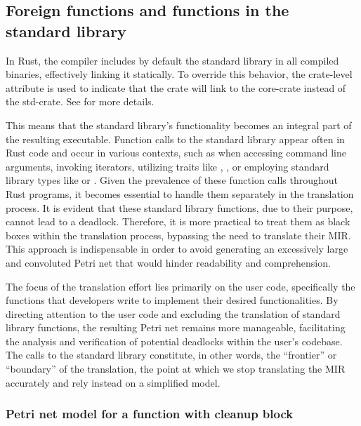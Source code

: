 \subsection{Foreign functions and functions in the standard library}

In Rust, the compiler includes by default
the standard library in all compiled binaries, effectively linking it statically.
To override this behavior, the crate-level attribute \Rustinline{#![no_std]}
is used to indicate that the crate will link to the core-crate instead of the std-crate.
See \cite{embedded-book} for more details.

This means that the standard library's functionality becomes an integral part of the resulting executable.
Function calls to the standard library appear often in Rust code and occur in various contexts,
such as when accessing command line arguments, invoking iterators,
utilizing traits like , ,
or employing standard library types like  or .
Given the prevalence of these function calls throughout Rust programs,
it becomes essential to handle them separately in the translation process.
It is evident that these standard library functions, due to their purpose, cannot lead to a deadlock.
Therefore, it is more practical to treat them as black boxes within the translation process,
bypassing the need to translate their \acrshort{MIR}.
This approach is indispensable in order to avoid generating
an excessively large and convoluted Petri net that would hinder readability and comprehension.

The focus of the translation effort lies primarily on the user code, specifically
the functions that developers write to implement their desired functionalities.
By directing attention to the user code and excluding the translation of standard library functions,
the resulting Petri net remains more manageable,
facilitating the analysis and verification of potential deadlocks within the user's codebase.
The calls to the standard library constitute, in other words,
the ``frontier'' or ``boundary'' of the translation,
the point at which we stop translating the \acrshort{MIR} accurately
and rely instead on a simplified model.

\subsubsection{Petri net model for a function with cleanup block}

